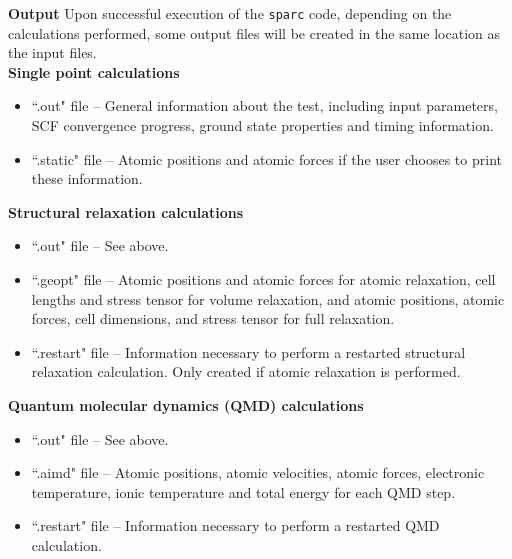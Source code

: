 \begin{frame}{\textbf{Output}} \label{Output}
Upon successful execution of the \texttt{sparc} code, depending on the calculations performed, some output files will be created in the same location as the input files. \\

\textbf{Single point calculations}  \\
\begin{itemize}
  \item ``.out" file -- General information about the test, including input parameters, SCF convergence progress, ground state properties and timing information.
  \item ``.static" file -- Atomic positions and atomic forces if the user chooses to print these information.
\end{itemize}

\textbf{Structural relaxation calculations}  \\
\begin{itemize}
  \item ``.out" file -- See above.
  \item ``.geopt" file -- Atomic positions and atomic forces for atomic relaxation, cell lengths and stress tensor for volume relaxation, and atomic positions, atomic forces, cell dimensions, and stress tensor for full relaxation.
  \item ``.restart" file -- Information necessary to perform a restarted structural relaxation calculation. Only created if atomic relaxation is performed.
\end{itemize}

\textbf{Quantum molecular dynamics (QMD) calculations}  \\
\begin{itemize}
  \item ``.out" file -- See above.
  \item ``.aimd" file -- Atomic positions, atomic velocities, atomic forces, electronic temperature, ionic temperature and total energy for each QMD step.
  \item ``.restart" file -- Information necessary to perform a restarted QMD calculation. 
\end{itemize}

\end{frame}


